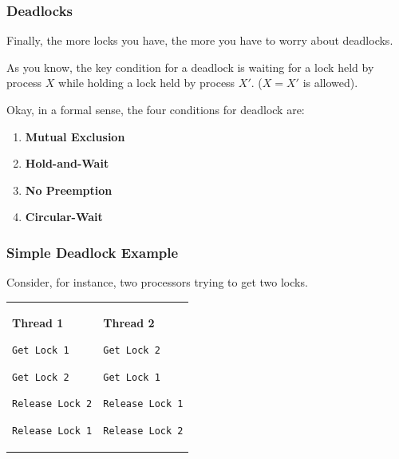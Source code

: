 \begin{frame}
\frametitle{Deadlocks}

Finally, the more locks you have, the more you have to worry about deadlocks.

As you know, the key condition for a deadlock is waiting for a lock held by process $X$ while holding a lock held by process $X'$. ($X = X'$ is allowed).

Okay, in a formal sense, the four conditions for deadlock are:

\begin{enumerate}
	\item \textbf{Mutual Exclusion}
	\item \textbf{Hold-and-Wait}
	\item \textbf{No Preemption}
	\item \textbf{Circular-Wait}
\end{enumerate}

\end{frame}


\begin{frame}[fragile]
\frametitle{Simple Deadlock Example}

Consider, for instance, two processors trying to get two locks.

\begin{center}
  \begin{tabular}{ll}
\begin{minipage}{.4\textwidth}
      {\bf Thread 1}

      \verb+Get Lock 1+

      \verb+Get Lock 2+

      \verb+Release Lock 2+

      \verb+Release Lock 1+
\end{minipage} & 
\begin{minipage}{.4\textwidth}
      {\bf Thread 2}

      \verb+Get Lock 2+

      \verb+Get Lock 1+

      \verb+Release Lock 1+

      \verb+Release Lock 2+
\end{minipage}
\end{tabular}
\end{center}


\end{frame}


